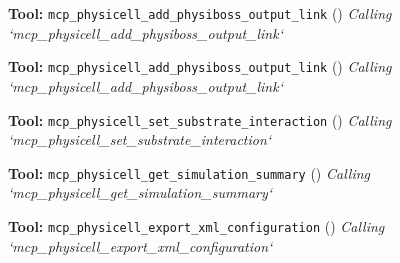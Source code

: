 \documentclass[11pt,a4paper]{article}
\begin{document}
\begin{toolokbox}
\textbf{Tool:} \texttt{mcp\_physicell\_add\_physiboss\_output\_link} (\checkmark)
\textit{Calling `mcp\_physicell\_add\_physiboss\_output\_link`}
\end{toolokbox}
\begin{toolokbox}
\textbf{Tool:} \texttt{mcp\_physicell\_add\_physiboss\_output\_link} (\checkmark)
\textit{Calling `mcp\_physicell\_add\_physiboss\_output\_link`}
\end{toolokbox}
\begin{toolokbox}
\textbf{Tool:} \texttt{mcp\_physicell\_set\_substrate\_interaction} (\checkmark)
\textit{Calling `mcp\_physicell\_set\_substrate\_interaction`}
\end{toolokbox}
\begin{toolokbox}
\textbf{Tool:} \texttt{mcp\_physicell\_get\_simulation\_summary} (\checkmark)
\textit{Calling `mcp\_physicell\_get\_simulation\_summary`}
\end{toolokbox}
\begin{toolokbox}
\textbf{Tool:} \texttt{mcp\_physicell\_export\_xml\_configuration} (\checkmark)
\textit{Calling `mcp\_physicell\_export\_xml\_configuration`}
\end{toolokbox}
\end{document}
